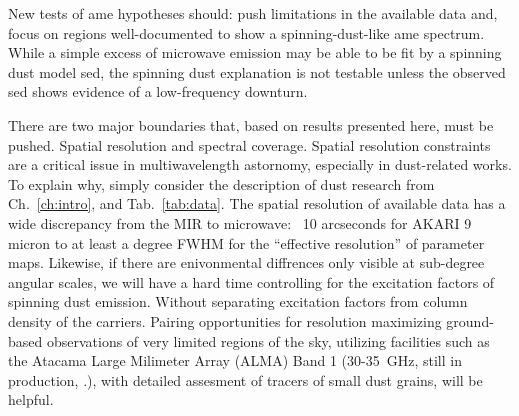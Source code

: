                 New tests of \acrshort{ame} hypotheses should: push limitations in the available data and, focus on regions well-documented to show a spinning-dust-like \acrshort{ame} spectrum. While a simple excess of microwave emission may be able to be fit by a spinning dust model \acrshort{sed}, the spinning dust explanation is not testable unless the observed \acrshort{sed} shows evidence of a low-frequency downturn.

                There are two major boundaries that, based on results presented here, must be pushed. Spatial resolution and spectral coverage.
                Spatial resolution constraints are a critical issue in multiwavelength astornomy, especially in dust-related works. To explain why, simply consider the description of dust research from Ch.~\ref{ch:intro}, and Tab.~\ref{tab:data}. The spatial resolution of available data has a wide discrepancy from the MIR to microwave: ~10 arcseconds for AKARI 9 micron to at least a degree FWHM for the ``effective resolution'' of parameter maps. Likewise, if there are enivonmental diffrences only visible at sub-degree angular scales, we will have a hard time controlling for the excitation factors of spinning dust emission. Without separating excitation factors from column density of the carriers. Pairing opportunities for resolution maximizing ground-based observations of very limited regions of the sky, utilizing facilities such as the Atacama Large Milimeter Array (ALMA) Band 1 (30-35~GHz, still in production, \cite{huang16}.), with detailed assesment of tracers of small dust grains, will be helpful.

